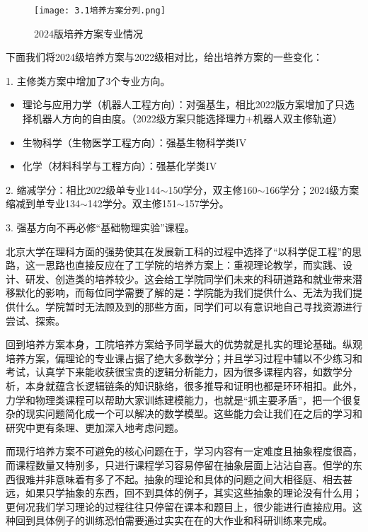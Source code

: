 \documentclass[11pt,oneside]{book}
\begin{document}
\begin{figure}[htbp]
    \centering
    \texttt{[image: 3.1培养方案分列.png]}
    \renewcommand{\figurename}{图}
    \caption{2024版培养方案专业情况}
    \label{fig:enter-label}
\end{figure}

下面我们将2024级培养方案与2022级相对比，给出培养方案的一些变化：

1. 主修类方案中增加了3个专业方向。

\begin{itemize}
    \item 理论与应用力学（机器人工程方向）：对强基生，相比2022版方案增加了只选择机器人方向的自由度。（2022级方案只能选择理力+机器人双主修轨道）

    \item 生物科学（生物医学工程方向）：强基生物科学类IV

    \item 化学（材料科学与工程方向）：强基化学类IV

\end{itemize}




2. 缩减学分：相比2022级单专业144$\sim$150学分，双主修160$\sim$166学分；2024级方案缩减到单专业134$\sim$142学分。双主修151$\sim$157学分。

3. 强基方向不再必修“基础物理实验”课程。

北京大学在理科方面的强势使其在发展新工科的过程中选择了“以科学促工程”的思路，这一思路也直接反应在了工学院的培养方案上：重视理论教学，而实践、设计、研发、创造类的培养较少。这会给工学院同学们未来的科研道路和就业带来潜移默化的影响，而每位同学需要了解的是：学院能为我们提供什么、无法为我们提供什么。学院暂时无法顾及到的那些方面，同学们可以有意识地自己寻找资源进行尝试、探索。

回到培养方案本身，工院培养方案给予同学最大的优势就是扎实的理论基础。纵观培养方案，偏理论的专业课占据了绝大多数学分；并且学习过程中辅以不少练习和考试，认真学下来能收获很宝贵的逻辑分析能力，因为很多课程内容，如数学分析，本身就蕴含长逻辑链条的知识脉络，很多推导和证明也都是环环相扣。此外，力学和物理类课程可以帮助大家训练建模能力，也就是“抓主要矛盾”，把一个很复杂的现实问题简化成一个可以解决的数学模型。这些能力会让我们在之后的学习和研究中更有条理、更加深入地考虑问题。

而现行培养方案不可避免的核心问题在于，学习内容有一定难度且抽象程度很高，而课程数量又特别多，只进行课程学习容易停留在抽象层面上沾沾自喜。但学的东西很难并非意味着有多了不起。抽象的理论和具体的问题之间大相径庭、相去甚远，如果只学抽象的东西，回不到具体的例子，其实这些抽象的理论没有什么用；更何况我们学习理论的过程往往只停留在课本和题目上，很少能进行直接应用。这种回到具体例子的训练恐怕需要通过实实在在的大作业和科研训练来完成。
\end{document}
